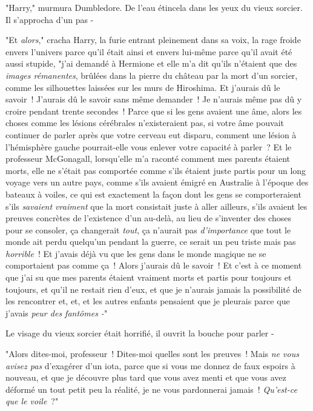"Harry," murmura Dumbledore. De l'eau étincela dans les yeux du vieux sorcier. Il s'approcha d'un pas -

"Et \emph{alors}," cracha Harry, la furie entrant pleinement dans sa voix, la rage froide envers l'univers parce qu'il était ainsi et envers lui-même parce qu'il avait été aussi stupide, "j'ai demandé à Hermione et elle m'a dit qu'ils n'étaient que des \emph{images rémanentes}, brûlées dans la pierre du château par la mort d'un sorcier, comme les silhouettes laissées sur les murs de Hiroshima. Et j'aurais dû le savoir~! J'aurais dû le savoir sans même demander~! Je n'aurais même pas dû y croire pendant trente secondes~! Parce que si les gens avaient une âme, alors les choses comme les lésions cérébrales n'existeraient pas, si votre âme pouvait continuer de parler après que votre cerveau eut disparu, comment une lésion à l'hémisphère gauche pourrait-elle vous enlever votre capacité à parler~? Et le professeur McGonagall, lorsqu'elle m'a raconté comment mes parents étaient morts, elle ne s'était pas comportée comme s'ils étaient juste partis pour un long voyage vers un autre pays, comme s'ils avaient émigré en Australie à l'époque des bateaux à voiles, ce qui est exactement la façon dont les gens se comporteraient s'ils \emph{savaient vraiment} que la mort consistait juste à aller ailleurs, s'ils avaient les preuves concrètes de l'existence d'un au-delà, au lieu de s'inventer des choses pour se consoler, ça changerait \emph{tout}, ça n'aurait pas \emph{d'importance} que tout le monde ait perdu quelqu'un pendant la guerre, ce serait un peu triste mais pas \emph{horrible}~! Et j'avais déjà vu que les gens dans le monde magique ne se comportaient pas comme ça~! Alors j'aurais dû le savoir~! Et c'est à ce moment que j'ai su que mes parents étaient vraiment morts et partis pour toujours et toujours, et qu'il ne restait rien d'eux, et que je n'aurais jamais la possibilité de les rencontrer et, et, et les autres enfants pensaient que je pleurais parce que j'avais \emph{peur des fantômes -}"

Le visage du vieux sorcier était horrifié, il ouvrit la bouche pour parler -

"Alors dites-moi, professeur~! Dites-moi quelles sont les preuves~! Mais \emph{ne vous avisez pas} d'exagérer d'un iota, parce que si vous me donnez de faux espoirs à nouveau, et que je découvre plus tard que vous avez menti et que vous avez déformé un tout petit peu la réalité, je ne vous pardonnerai jamais~! \emph{Qu'est-ce que le voile}~?"

